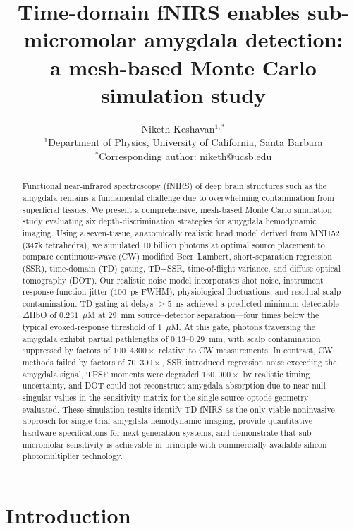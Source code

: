 \documentclass[11pt,a4paper]{article}
\title{\textbf{Time-domain fNIRS enables sub-micromolar amygdala detection:}\\[0.3em]
\textbf{a mesh-based Monte Carlo simulation study}}
\author{Niketh Keshavan$^{1,*}$\\[0.5em]
\small $^1$Department of Physics, University of California, Santa Barbara\\
\small $^*$Corresponding author: niketh@ucsb.edu}
\date{}
\begin{document}
\maketitle

\begin{abstract}
\noindent
Functional near-infrared spectroscopy (fNIRS) of deep brain structures such as the amygdala remains a fundamental challenge due to overwhelming contamination from superficial tissues. We present a comprehensive, mesh-based Monte Carlo simulation study evaluating six depth-discrimination strategies for amygdala hemodynamic imaging. Using a seven-tissue, anatomically realistic head model derived from MNI152 (347k tetrahedra), we simulated 10 billion photons at optimal source placement to compare continuous-wave (CW) modified Beer--Lambert, short-separation regression (SSR), time-domain (TD) gating, TD+SSR, time-of-flight variance, and diffuse optical tomography (DOT). Our realistic noise model incorporates shot noise, instrument response function jitter ($100$~ps FWHM), physiological fluctuations, and residual scalp contamination. TD gating at delays $\geq 5$~ns achieved a predicted minimum detectable $\Delta$HbO of $0.231$~$\mu$M at 29~mm source--detector separation---four times below the typical evoked-response threshold of $1$~$\mu$M. At this gate, photons traversing the amygdala exhibit partial pathlengths of $0.13$--$0.29$~mm, with scalp contamination suppressed by factors of $100$--$4300\times$ relative to CW measurements. In contrast, CW methods failed by factors of $70$--$300\times$, SSR introduced regression noise exceeding the amygdala signal, TPSF moments were degraded $150{,}000\times$ by realistic timing uncertainty, and DOT could not reconstruct amygdala absorption due to near-null singular values in the sensitivity matrix for the single-source optode geometry evaluated. These simulation results identify TD fNIRS as the only viable noninvasive approach for single-trial amygdala hemodynamic imaging, provide quantitative hardware specifications for next-generation systems, and demonstrate that sub-micromolar sensitivity is achievable in principle with commercially available silicon photomultiplier technology.
\end{abstract}

\section{Introduction}
\end{document}
